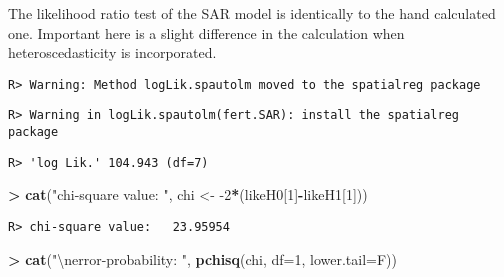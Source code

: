 \documentclass[
]{article}
\newenvironment{Shaded}{\begin{snugshade}}{\end{snugshade}}
\newcommand{\CharTok}[1]{\textcolor[rgb]{0.31,0.60,0.02}{#1}}
\newcommand{\CommentTok}[1]{\textcolor[rgb]{0.56,0.35,0.01}{\textit{#1}}}
\newcommand{\DataTypeTok}[1]{\textcolor[rgb]{0.13,0.29,0.53}{#1}}
\newcommand{\DecValTok}[1]{\textcolor[rgb]{0.00,0.00,0.81}{#1}}
\newcommand{\ErrorTok}[1]{\textcolor[rgb]{0.64,0.00,0.00}{\textbf{#1}}}
\newcommand{\KeywordTok}[1]{\textcolor[rgb]{0.13,0.29,0.53}{\textbf{#1}}}
\newcommand{\NormalTok}[1]{#1}
\newcommand{\OperatorTok}[1]{\textcolor[rgb]{0.81,0.36,0.00}{\textbf{#1}}}
\newcommand{\StringTok}[1]{\textcolor[rgb]{0.31,0.60,0.02}{#1}}
\begin{document}
The likelihood ratio test of the SAR model is identically to the hand
calculated one. Important here is a slight difference in the calculation
when heteroscedasticity is incorporated.

\begin{Shaded}
\end{Shaded}

\begin{verbatim}
R> Warning: Method logLik.spautolm moved to the spatialreg package
\end{verbatim}

\begin{verbatim}
R> Warning in logLik.spautolm(fert.SAR): install the spatialreg package
\end{verbatim}

\begin{verbatim}
R> 'log Lik.' 104.943 (df=7)
\end{verbatim}

\begin{Shaded}
\begin{Highlighting}[]
\OperatorTok{>}\StringTok{ }\KeywordTok{cat}\NormalTok{(}\StringTok{"chi-square value:  "}\NormalTok{, chi <-}\StringTok{ }\DecValTok{-2}\OperatorTok{*}\NormalTok{(likeH0[}\DecValTok{1}\NormalTok{]}\OperatorTok{-}\NormalTok{likeH1[}\DecValTok{1}\NormalTok{]))}
\end{Highlighting}
\end{Shaded}

\begin{verbatim}
R> chi-square value:   23.95954
\end{verbatim}

\begin{Shaded}
\begin{Highlighting}[]
\OperatorTok{>}\StringTok{ }\KeywordTok{cat}\NormalTok{(}\StringTok{"}\CharTok{\textbackslash{}n}\StringTok{error-probability: "}\NormalTok{, }\KeywordTok{pchisq}\NormalTok{(chi, }\DataTypeTok{df=}\DecValTok{1}\NormalTok{, }\DataTypeTok{lower.tail=}\NormalTok{F))}
\end{Highlighting}
\end{Shaded}
\end{document}
